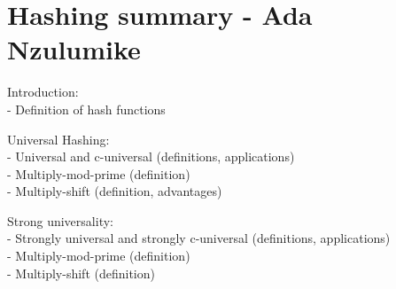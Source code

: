 \section*{Hashing summary - Ada Nzulumike}

Introduction:
\\
- Definition of hash functions

Universal Hashing:
\\
- Universal and c-universal (definitions, applications)
\\
- Multiply-mod-prime (definition)
\\
- Multiply-shift (definition, advantages)

Strong universality:
\\
- Strongly universal and strongly c-universal (definitions, applications)
\\
- Multiply-mod-prime (definition)
\\
- Multiply-shift (definition)